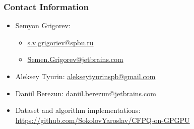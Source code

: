 \documentclass[xcolor=table]{beamer}
\begin{document}
\begin{frame}
\frametitle{Contact Information}
\begin{itemize}
  \item Semyon Grigorev:
    \begin{itemize}
      \item \href{mailto:s.v.grigoriev@spbu.ru}{s.v.grigoriev@spbu.ru}
      \item \href{mailto:Semen.Grigorev@jetbrains.com}{Semen.Grigorev@jetbrains.com}
    \end{itemize}

  \item Aleksey Tyurin: \href{mailto:alekseytyurinspb@gmail.com}{alekseytyurinspb@gmail.com}
  \item Daniil Berezun: \href{mailto:daniil.berezun@jetbrains.com}{daniil.berezun@jetbrains.com}

\vspace{0.5cm}
  \item Dataset and algorithm implementations: \href{https://github.com/SokolovYaroslav/CFPQ-on-GPGPU}{https://github.com/SokolovYaroslav/CFPQ-on-GPGPU}
\end{itemize}
\vspace{0.1cm}
\end{frame}
\end{document}
